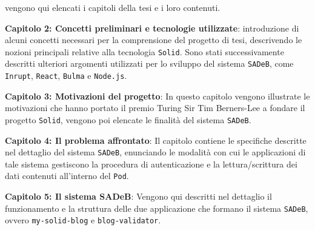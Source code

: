 \clearpage

vengono qui elencati i capitoli della tesi e i loro contenuti.

\bigskip
\bigskip

\textbf{Capitolo 2: Concetti preliminari e tecnologie utilizzate}:  introduzione di alcuni concetti necessari per la comprensione del progetto di tesi, descrivendo le nozioni principali relative alla tecnologia {\tt Solid}. Sono stati successivamente descritti ulteriori argomenti
utilizzati per lo sviluppo del sistema {\tt SADeB}, come {\tt Inrupt}, {\tt React}, {\tt Bulma} e {\tt Node.js}.

\bigskip

\textbf{Capitolo 3: Motivazioni del progetto}: In questo capitolo vengono illustrate le motivazioni che hanno portato il premio Turing Sir Tim Berners-Lee a fondare il progetto {\tt Solid}, vengono poi elencate le finalità del sistema {\tt SADeB}. 

\bigskip

\textbf{Capitolo 4: Il problema affrontato}: Il capitolo contiene le specifiche descritte nel dettaglio del sistema {\tt SADeB}, enunciando le modalità con cui le applicazioni di tale sistema gestiscono la procedura di autenticazione e la lettura/scrittura dei dati contenuti all'interno del {\tt Pod}.

\bigskip

\textbf{Capitolo 5: Il sistema SADeB}: Vengono qui descritti nel dettaglio il funzionamento e la struttura delle due applicazione che formano il sistema {\tt SADeB}, ovvero {\tt my-solid-blog} e {\tt blog-validator}.

\clearpage